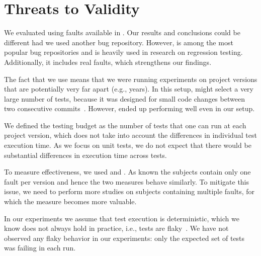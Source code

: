 \section{Threats to Validity}
\label{sec:orch_threats}

We evaluated \fz using faults available in \dfj.  Our results and
conclusions could be different had we used another bug repository.
However, \dfj is among the most popular bug repositories and is
heavily used in research on regression testing.  Additionally, it
includes real faults, which strengthens our findings.

The fact that we use \dfj means that we were running experiments on
project versions that are potentially very far apart (e.g., years).
In this setup, \ek might select a very large number of tests, because
it was designed for small code changes between two
consecutive commits~\cite{gligoricEk, vasic_file-level_2017}.  However, 
\ek ended up performing well
even in our setup.

We defined the testing budget as the number of tests that one can run
at each project version, which does not take into account the
differences in individual test execution time.  As we focus on unit
tests, we do not expect that there would be substantial differences in
execution time across tests.

To measure effectiveness, we used \ttff and \apfd. As known the \dfj subjects contain only one fault per version and hence the two measures behave similarly. 
To mitigate this issue, we need to perform more studies on subjects containing multiple faults, for which the \apfd measure becomes more valuable. 

In our experiments we assume that test execution is deterministic,
which we know  does not always hold in practice, i.e.,
tests are flaky~\cite{luo2014empirical,harman2018start}.
We have not observed any flaky behavior in our
experiments: only the expected set of tests was failing in each run.
